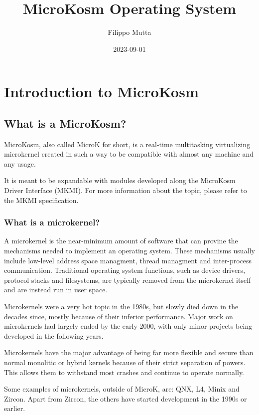 \documentclass{report}
\title{MicroKosm Operating System}
\date{2023-09-01}
\author{Filippo Mutta}
\begin{document}
\maketitle
\newpage


\tableofcontents

\chapter{Introduction to MicroKosm}

\section{What is a MicroKosm?}
MicroKosm, also called MicroK for short, is a real-time multitasking virtualizing microkernel created in such a way to be compatible with almost any machine and any usage.

It is meant to be expandable with modules developed along the MicroKosm Driver Interface (MKMI). For more information about the topic, please refer to the MKMI specification.

\subsection{What is a microkernel?}
A microkernel is the near-minimum amount of software that can provine the mechanisms needed to implement an operating system. These mechanisms usually include low-level address space managment, thread managment and inter-process communication. Traditional operating system functions, such as device drivers, protocol stacks and filesystems, are typically removed from the microkernel itself and are instead run in user space.

Microkernels were a very hot topic in the 1980s, but slowly died down in the decades since, mostly because of their inferior performance. Major work on microkernels had largely ended by the early 2000, with only minor projects being developed in the following years.

Microkernels have the major advantage of being far more flexible and secure than normal monolitic or hybrid kernels because of their strict separation of powers. This allows them to withstand most crashes and continue to operate normally.

Some examples of microkernels, outside of MicroK, are: QNX, L4, Minix and Zircon. Apart from Zircon, the others have started development in the 1990s or earlier.
\end{document}
